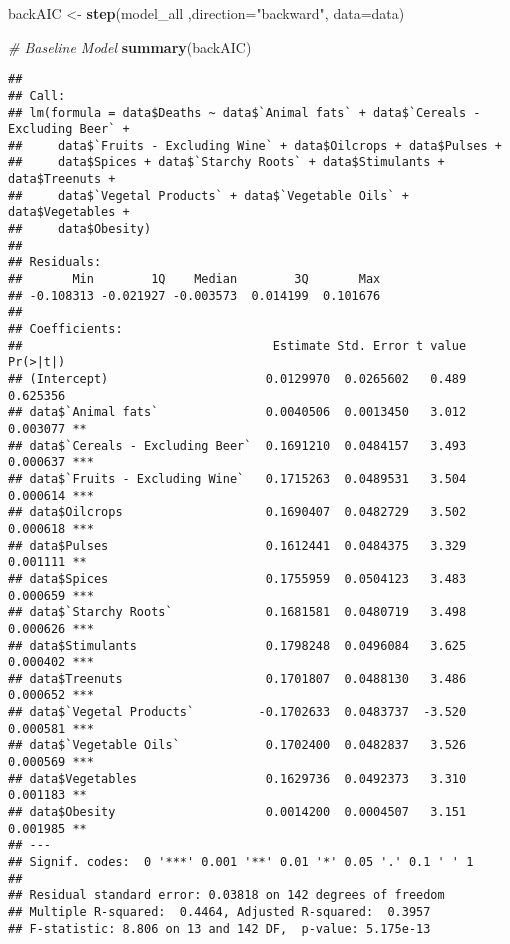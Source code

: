 \documentclass[
]{article}
\newenvironment{Shaded}{\begin{snugshade}}{\end{snugshade}}
\newcommand{\CommentTok}[1]{\textcolor[rgb]{0.56,0.35,0.01}{\textit{#1}}}
\newcommand{\DataTypeTok}[1]{\textcolor[rgb]{0.13,0.29,0.53}{#1}}
\newcommand{\KeywordTok}[1]{\textcolor[rgb]{0.13,0.29,0.53}{\textbf{#1}}}
\newcommand{\NormalTok}[1]{#1}
\newcommand{\StringTok}[1]{\textcolor[rgb]{0.31,0.60,0.02}{#1}}
\begin{document}
\begin{Shaded}
\begin{Highlighting}[]
\NormalTok{backAIC <-}\StringTok{ }\KeywordTok{step}\NormalTok{(model_all ,}\DataTypeTok{direction=}\StringTok{"backward"}\NormalTok{, }\DataTypeTok{data=}\NormalTok{data)}
\end{Highlighting}
\end{Shaded}

\begin{Shaded}
\begin{Highlighting}[]
\CommentTok{# Baseline Model}
\KeywordTok{summary}\NormalTok{(backAIC)}
\end{Highlighting}
\end{Shaded}

\begin{verbatim}
## 
## Call:
## lm(formula = data$Deaths ~ data$`Animal fats` + data$`Cereals - Excluding Beer` + 
##     data$`Fruits - Excluding Wine` + data$Oilcrops + data$Pulses + 
##     data$Spices + data$`Starchy Roots` + data$Stimulants + data$Treenuts + 
##     data$`Vegetal Products` + data$`Vegetable Oils` + data$Vegetables + 
##     data$Obesity)
## 
## Residuals:
##       Min        1Q    Median        3Q       Max 
## -0.108313 -0.021927 -0.003573  0.014199  0.101676 
## 
## Coefficients:
##                                   Estimate Std. Error t value Pr(>|t|)    
## (Intercept)                      0.0129970  0.0265602   0.489 0.625356    
## data$`Animal fats`               0.0040506  0.0013450   3.012 0.003077 ** 
## data$`Cereals - Excluding Beer`  0.1691210  0.0484157   3.493 0.000637 ***
## data$`Fruits - Excluding Wine`   0.1715263  0.0489531   3.504 0.000614 ***
## data$Oilcrops                    0.1690407  0.0482729   3.502 0.000618 ***
## data$Pulses                      0.1612441  0.0484375   3.329 0.001111 ** 
## data$Spices                      0.1755959  0.0504123   3.483 0.000659 ***
## data$`Starchy Roots`             0.1681581  0.0480719   3.498 0.000626 ***
## data$Stimulants                  0.1798248  0.0496084   3.625 0.000402 ***
## data$Treenuts                    0.1701807  0.0488130   3.486 0.000652 ***
## data$`Vegetal Products`         -0.1702633  0.0483737  -3.520 0.000581 ***
## data$`Vegetable Oils`            0.1702400  0.0482837   3.526 0.000569 ***
## data$Vegetables                  0.1629736  0.0492373   3.310 0.001183 ** 
## data$Obesity                     0.0014200  0.0004507   3.151 0.001985 ** 
## ---
## Signif. codes:  0 '***' 0.001 '**' 0.01 '*' 0.05 '.' 0.1 ' ' 1
## 
## Residual standard error: 0.03818 on 142 degrees of freedom
## Multiple R-squared:  0.4464, Adjusted R-squared:  0.3957 
## F-statistic: 8.806 on 13 and 142 DF,  p-value: 5.175e-13
\end{verbatim}
\end{document}
